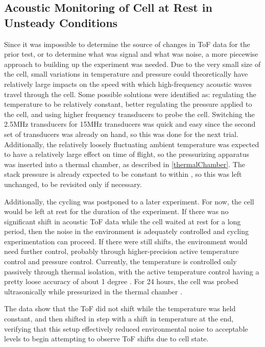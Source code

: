 \subsection{Acoustic Monitoring of Cell at Rest in Unsteady Conditions}\label{chamberTest}
Since it was impossible to determine the source of changes in ToF data for the prior test, or to determine what was signal and what was noise, a more piecewise approach to building up the experiment was needed. Due to the very small size of the cell, small variations in temperature and pressure could theoretically have relatively large impacts on the speed with which high-frequency acoustic waves travel through the cell. Some possible solutions were identified as: regulating the temperature to be relatively constant, better regulating the pressure applied to the cell, and using higher frequency transducers to probe the cell. Switching the 2.5MHz transducers for 15MHz transducers was quick and easy since the second set of transducers was already on hand, so this was done for the next trial. Additionally, the relatively loosely fluctuating ambient temperature was expected to have a relatively large effect on time of flight, so the pressurizing apparatus was inserted into a thermal chamber, as described in \hyperref[thermalChamber]{\cref{thermalChamber}}. The stack pressure is already expected to be constant to within , so this was left unchanged, to be revisited only if necessary.

Additionally, the cycling was postponed to a later experiment.
For now, the cell would be left at rest for the duration of the experiment. 
If there was no significant shift in acoustic ToF data while the cell waited at rest for a long period, then the noise in the environment is adequately controlled and cycling experimentation can proceed. 
If there were still shifts, the environment would need further control, probably through higher-precision active temperature control and pressure control. 
Currently, the temperature is controlled only passively through thermal isolation, with the active temperature control having a pretty loose accuracy of about 1 degree .
For 24 hours, the cell was probed ultrasonically while pressurized in the thermal chamber .

The data show that the ToF did not shift while the temperature was held constant, and then shifted in step with a shift in temperature at the end, verifying that this setup effectively reduced environmental noise to acceptable levels to begin attempting to observe ToF shifts due to cell state.



